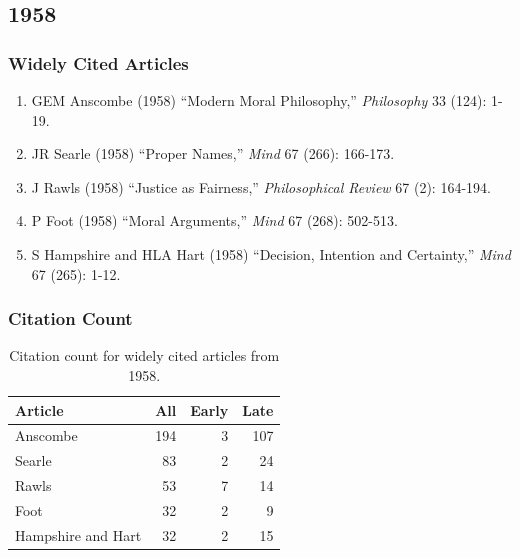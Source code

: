 \documentclass[
  10pt,
  letterpaper,
  DIV=11,
  numbers=noendperiod,
  twoside]{scrartcl}
\providecommand{\tightlist}{%
  \setlength{\itemsep}{0pt}\setlength{\parskip}{0pt}}\usepackage{longtable,booktabs,array}
\begin{document}
\newpage

\subsection{1958}\label{sec-s1958}

\subsubsection*{Widely Cited Articles}\label{widely-cited-articles-2}

\begin{enumerate}
\def\labelenumi{\arabic{enumi}.}
\tightlist
\item
  GEM Anscombe (1958) ``Modern Moral Philosophy,'' \emph{Philosophy} 33
  (124): 1-19.
\item
  JR Searle (1958) ``Proper Names,'' \emph{Mind} 67 (266): 166-173.
\item
  J Rawls (1958) ``Justice as Fairness,'' \emph{Philosophical Review} 67
  (2): 164-194.
\item
  P Foot (1958) ``Moral Arguments,'' \emph{Mind} 67 (268): 502-513.
\item
  S Hampshire and HLA Hart (1958) ``Decision, Intention and Certainty,''
  \emph{Mind} 67 (265): 1-12.
\end{enumerate}

\subsubsection*{Citation Count}\label{sec-count-1958}

\begin{longtable}[]{@{}lrrr@{}}

\caption{\label{tbl-citation-count-1958}Citation count for widely cited
articles from 1958.}

\tabularnewline

\toprule\noalign{}
Article & All & Early & Late \\
\midrule\noalign{}
\endhead
\bottomrule\noalign{}
\endlastfoot
Anscombe & 194 & 3 & 107 \\
Searle & 83 & 2 & 24 \\
Rawls & 53 & 7 & 14 \\
Foot & 32 & 2 & 9 \\
Hampshire and Hart & 32 & 2 & 15 \\

\end{longtable}
\end{document}
